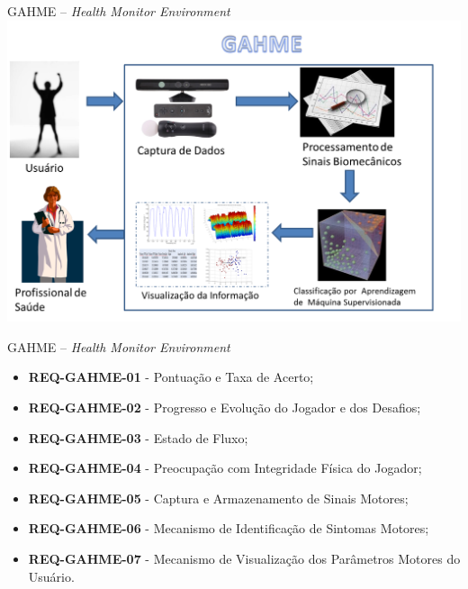 \documentclass{beamer}
\begin{document}
\subsection{}
\begin{frame}{GAHME – \textit{Health Monitor Environment}}
      \top \includegraphics[height=2.6 in]{img/systemoverview.png}
\end{frame}

\begin{frame}{GAHME – \textit{Health Monitor Environment}}
	\begin{block}{}
		\begin{itemize}[<+->]
			\item	\textbf{REQ-GAHME-01} - Pontuação e Taxa de Acerto;
			\item	\textbf{REQ-GAHME-02} - Progresso e Evolução do Jogador e dos Desafios;
			\item	\textbf{REQ-GAHME-03} - Estado de Fluxo;
			\item	\textbf{REQ-GAHME-04} - Preocupação com Integridade Física do Jogador;
			\item	\textbf{REQ-GAHME-05} - Captura e Armazenamento de Sinais Motores;
			\item	\textbf{REQ-GAHME-06} - Mecanismo de Identificação de Sintomas Motores;
			\item	\textbf{REQ-GAHME-07} - Mecanismo de Visualização dos Parâmetros Motores do Usuário.
		\end{itemize}
	\end{block}
\end{frame}
\end{document}
